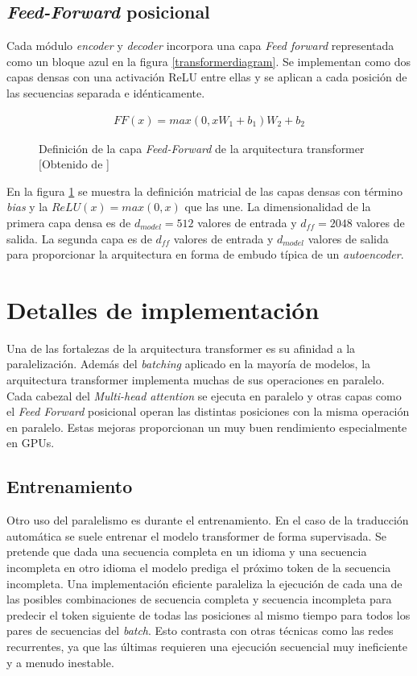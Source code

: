 \subsection{\textit{Feed-Forward} posicional}\label{transfffpos}
Cada módulo \textit{encoder} y \textit{decoder} incorpora una capa \textit{Feed forward} representada como un bloque azul en la figura \ref{transformerdiagram}. Se implementan como dos capas densas con una activación ReLU entre ellas y se aplican a cada posición de las secuencias separada e idénticamente.

\begin{figure}[H]
    \begin{align*}
        FF(x) = max(0, xW_{1}+b_{1})W_{2}+b_{2}
    \end{align*}
    \caption{Definición de la capa \textit{Feed-Forward} de la arquitectura transformer [Obtenido de \cite{Vaswani2017Jun}]}\label{transformerffposform}
\end{figure}

En la figura \ref{transformerffposform} se muestra la definición matricial de las capas densas con término \textit{bias} y la $ReLU(x)=max(0,x)$ que las une.
La dimensionalidad de la primera capa densa es de $d_{model}=512$ valores de entrada y $d_{ff}=2048$ valores de salida. La segunda capa es de $d_{ff}$ valores de entrada y $d_{model}$ valores de salida para proporcionar la arquitectura en forma de embudo típica de un \textit{autoencoder}.

\section{Detalles de implementación}
Una de las fortalezas de la arquitectura transformer es su afinidad a la paralelización. Además del \textit{batching} aplicado en la mayoría de modelos, la arquitectura transformer implementa muchas de sus operaciones en paralelo. Cada cabezal del \textit{Multi-head attention} se ejecuta en paralelo y otras capas como el \textit{Feed Forward} posicional operan las distintas posiciones con la misma operación en paralelo. Estas mejoras proporcionan un muy buen rendimiento especialmente en GPUs.
\subsection{Entrenamiento}
Otro uso del paralelismo es durante el entrenamiento. En el caso de la traducción automática se suele entrenar el modelo transformer de forma supervisada. Se pretende que dada una secuencia completa en un idioma y una secuencia incompleta en otro idioma el modelo prediga el próximo token de la secuencia incompleta.
Una implementación eficiente paraleliza la ejecución de cada una de las posibles combinaciones de secuencia completa y secuencia incompleta para predecir el token siguiente de todas las posiciones al mismo tiempo para todos los pares de secuencias del \textit{batch}. Esto contrasta con otras técnicas como las redes recurrentes, ya que las últimas requieren una ejecución secuencial muy ineficiente y a menudo inestable.

